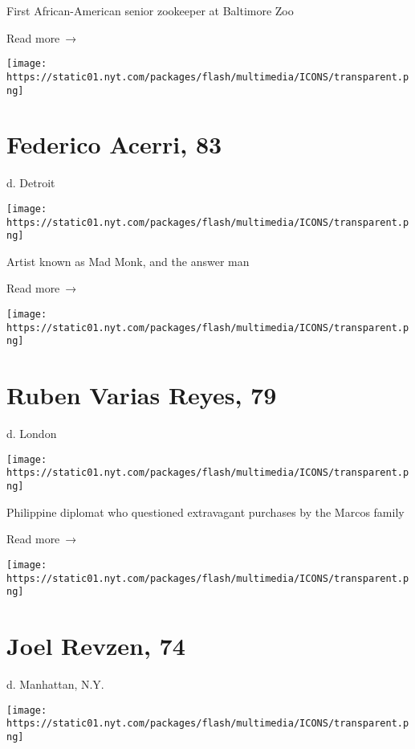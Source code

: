 First African-American senior zookeeper at Baltimore Zoo

 Read more~→

\href{https://www.nytimes.com/2020/06/02/us/federico-acerri-dead-coronavirus.html}{}

\texttt{[image: https://static01.nyt.com/packages/flash/multimedia/ICONS/transparent.png]}

\hypertarget{federico-acerri-83}{%
\section{Federico Acerri, 83}\label{federico-acerri-83}}

d. Detroit

\texttt{[image: https://static01.nyt.com/packages/flash/multimedia/ICONS/transparent.png]}

Artist known as Mad Monk, and the answer man

 Read more~→

\href{https://www.nytimes.com/2020/06/02/obituaries/ruben-varias-reyes-coronavirus-dead.html}{}

\texttt{[image: https://static01.nyt.com/packages/flash/multimedia/ICONS/transparent.png]}

\hypertarget{ruben-varias-reyes-79}{%
\section{Ruben Varias Reyes, 79}\label{ruben-varias-reyes-79}}

d. London

\texttt{[image: https://static01.nyt.com/packages/flash/multimedia/ICONS/transparent.png]}

Philippine diplomat who questioned extravagant purchases by the Marcos
family

 Read more~→

\href{https://www.nytimes.com/2020/06/01/obituaries/joel-revzen-dead-coronavirus.html}{}

\texttt{[image: https://static01.nyt.com/packages/flash/multimedia/ICONS/transparent.png]}

\hypertarget{joel-revzen-74}{%
\section{Joel Revzen, 74}\label{joel-revzen-74}}

d. Manhattan, N.Y.

\texttt{[image: https://static01.nyt.com/packages/flash/multimedia/ICONS/transparent.png]}

